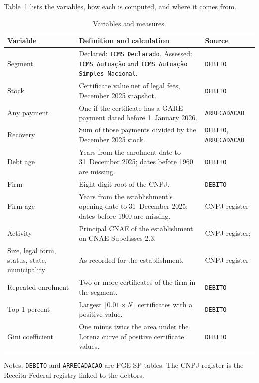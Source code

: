 Table~\ref{tab:vars} lists the variables, how each is computed, and where it comes from.

\begin{table}[t]
\centering
\small
\caption{Variables and measures.}\label{tab:vars}
\begin{tabular}{p{}p{}p{}}
\toprule
Variable & Definition and calculation & Source \\
\midrule
Segment & Declared: \texttt{ICMS Declarado}. Assessed: \texttt{ICMS Autua\c{c}\~ao} and \texttt{ICMS Autua\c{c}\~ao Simples Nacional}. & \texttt{DEBITO} \\
Stock & Certificate value net of legal fees, December 2025 snapshot. & \texttt{DEBITO} \\
Any payment & One if the certificate has a GARE payment dated before 1~January 2026. & \texttt{ARRECADACAO} \\
Recovery & Sum of those payments divided by the December 2025 stock. & \texttt{DEBITO}, \texttt{ARRECADACAO} \\
Debt age & Years from the enrolment date to 31~December 2025; dates before 1960 are missing. & \texttt{DEBITO} \\
Firm & Eight-digit root of the CNPJ. & \texttt{DEBITO} \\
Firm age & Years from the establishment's opening date to 31~December 2025; dates before 1900 are missing. & CNPJ register \\
Activity & Principal CNAE of the establishment on CNAE-Subclasses 2.3. & CNPJ register; \citet{ibge2019cnae} \\
Size, legal form, status, state, municipality & As recorded for the establishment. & CNPJ register \\
Repeated enrolment & Two or more certificates of the firm in the segment. & \texttt{DEBITO} \\
Top 1 percent & Largest $\lceil 0.01 \times N \rceil$ certificates with a positive value. & \texttt{DEBITO} \\
Gini coefficient & One minus twice the area under the Lorenz curve of positive certificate values. & \texttt{DEBITO} \\
\bottomrule
\end{tabular}

\vspace{0.4em}
\begin{minipage}{0.95\textwidth}
\footnotesize
Notes: \texttt{DEBITO} and \texttt{ARRECADACAO} are PGE-SP tables. The CNPJ register is the Receita Federal registry linked to the debtors.
\end{minipage}
\end{table}

